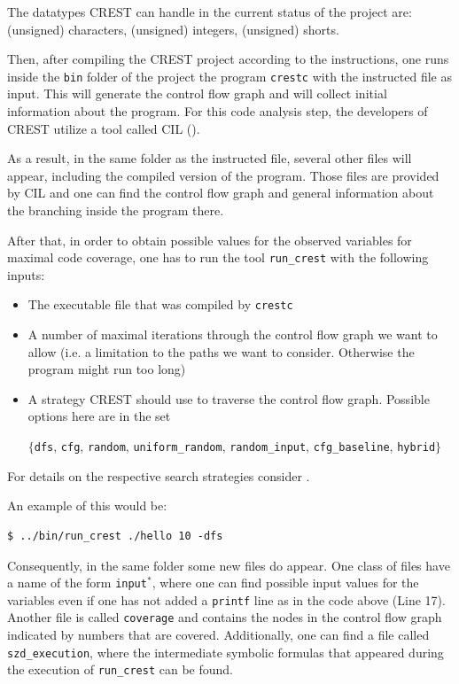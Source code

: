 \documentclass[oribibl, twocolumn]{llncs}
\begin{document}
\begin{remark}
  \label{rmrk:DataTypes}
  The datatypes \textsc{CREST} can handle in the current status of the
  project are: (unsigned) characters, (unsigned) integers, (unsigned) shorts.
\end{remark}

Then, after compiling the \textsc{CREST} project according to the
instructions, one runs inside the \texttt{bin} folder of the project
the program \texttt{crestc} with the instructed file as input. This
will generate the control flow graph and will collect initial information
about the program. For this code analysis step, the developers of
\textsc{CREST} utilize a tool called \textsc{CIL} (\cite{necula2002cil}).

As a result, in the same folder as the instructed file, several other
files will appear, including the compiled version of the
program. Those files are provided by \textsc{CIL} and one can find the
control flow graph and general information about the branching inside
the program there. %

After that, in order to obtain possible values for the observed
variables for maximal code coverage, one has to run the tool
\texttt{run\_crest} with the following inputs:
\begin{itemize}
  \item The executable file that was compiled by \texttt{crestc}
  \item A number of maximal iterations through the control flow graph
    we want to allow (i.e. a limitation to the paths we
    want to consider. Otherwise the program might run too long)
  \item A strategy \textsc{CREST} should use to traverse the control
    flow graph. Possible options here are in the set
\begin{center}
$\{$\texttt{dfs}, \texttt{cfg}, \texttt{random},
    \texttt{uniform\_random}, \texttt{random\_input}, 
    \texttt{cfg\_baseline}, \texttt{hybrid}$\}$
\end{center}
\end{itemize}
For details on the respective search strategies consider
\cite{CREST}.

An example of this would be:
\begin{verbatim}
$ ../bin/run_crest ./hello 10 -dfs
\end{verbatim}

Consequently, in the same folder some new files do appear. One class of
files have a name of the form \texttt{input}${}^*$, where one can find possible input
values for the variables even if one has not added a \texttt{printf} line as in the
code above (Line 17). Another file is called \texttt{coverage} and contains the
nodes in the control flow graph indicated by numbers that are
covered. Additionally, one can find a file called
\texttt{szd\_execution}, where the intermediate symbolic formulas that
appeared during the execution of \texttt{run\_crest} can be found.
\end{document}
